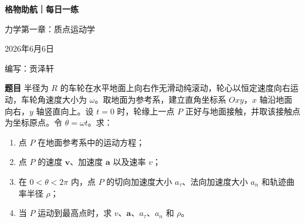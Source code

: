 \documentclass[11pt,a4paper]{ctexart}
\begin{document}
\begin{center}
  {\Large\bfseries\color{mainblue} 格物助航｜每日一练}\par
  \vspace{0.25em}
  {\large 力学第一章：质点运动学}\par
  \vspace{0.35em}
  {\small 2026年6月6日}\par
  \vspace{0.35em}
  {\small 编写：贡泽轩}
\end{center}

\vspace{-0.3em}

\begin{problemBox}
\noindent\textbf{题目}\quad
半径为 $R$ 的车轮在水平地面上向右作无滑动纯滚动，轮心以恒定速度向右运动，车轮角速度大小为 $\omega$。取地面为参考系，建立直角坐标系 $Oxy$，$x$ 轴沿地面向右，$y$ 轴竖直向上。设 $t=0$ 时，轮缘上一点 $P$ 正好与地面接触，并取该接触点为坐标原点。令 $\theta=\omega t$。求：
\begin{enumerate}
  \item 点 $P$ 在地面参考系中的运动方程；
  \item 点 $P$ 的速度 $\bm v$、加速度 $\bm a$ 以及速率 $v$；
  \item 在 $0<\theta<2\pi$ 内，点 $P$ 的切向加速度大小 $a_\tau$、法向加速度大小 $a_n$ 和轨迹曲率半径 $\rho$；
  \item 当 $P$ 运动到最高点时，求 $v$、$\bm a$、$a_\tau$、$a_n$ 和 $\rho$。
\end{enumerate}
\end{problemBox}
\end{document}

